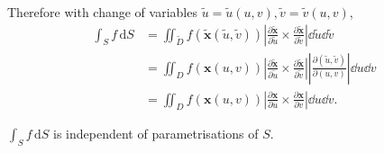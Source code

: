 Therefore with change of variables $ \tilde{u}=\tilde{u}(u,v),\tilde{v}=\tilde{v}(u,v) $,
\begin{align*}
    \int_{S} f \,\mathrm{d}S &= \iint_{\tilde{D}} f(\tilde{\mathbf{x}}(\tilde{u},\tilde{v})) \left|\frac{\partial \tilde{\mathbf{x}}}{\partial \tilde{u}}\times \frac{\partial \tilde{\mathbf{x}}}{\partial \tilde{v}}  \right| \dd \tilde{u}\dd \tilde{v}\\ 
    &= \iint_{D} f(\mathbf{x}(u,v)) \left|\frac{\partial \tilde{\mathbf{x}}}{\partial \tilde{u}}\times \frac{\partial \tilde{\mathbf{x}}}{\partial \tilde{v}}  \right| \left| \frac{\partial (\tilde{u},\tilde{v})}{\partial (u,v)} \right| \dd u\dd v\\ 
    &= \iint_{D} f(\mathbf{x}(u,v)) \left| \frac{\partial \mathbf{x}}{\partial u}\times \frac{\partial \mathbf{x}}{\partial v} \right| \dd u \dd v.
\end{align*}

\begin{proposition}
    $\displaystyle \int_{S} f \,\mathrm{d}S$ is independent of parametrisations of $S$.
\end{proposition}